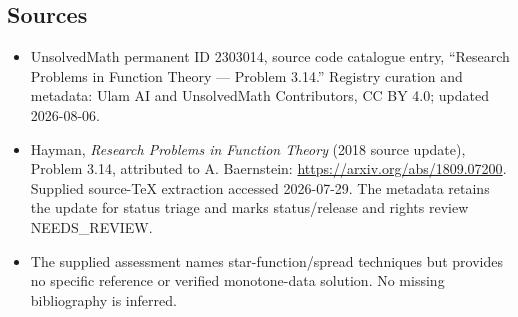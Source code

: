 \documentclass[11pt]{article}
\begin{document}
\subsection{Sources}
\begin{itemize}
\item UnsolvedMath permanent ID 2303014, source code catalogue entry, ``Research Problems in Function Theory --- Problem 3.14.'' Registry curation and metadata: Ulam AI and UnsolvedMath Contributors, CC BY 4.0; updated 2026-08-06.
\item Hayman, \emph{Research Problems in Function Theory} (2018 source update), Problem 3.14, attributed to A. Baernstein: \url{https://arxiv.org/abs/1809.07200}. Supplied source-TeX extraction accessed 2026-07-29. The metadata retains the update for status triage and marks status/release and rights review NEEDS\_REVIEW.
\item The supplied assessment names star-function/spread techniques but provides no specific reference or verified monotone-data solution. No missing bibliography is inferred.
\end{itemize}
\end{document}
